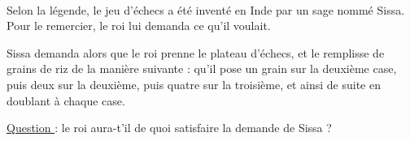 \documentclass[
	classe=$2^{de}$,
	headerTitle=Activité\space Chapitre\space 2
]{exercice}
\begin{document}
\vspace{1em}
\begin{exercice}\

	Selon la légende, le jeu d'échecs a été inventé en Inde par un sage nommé Sissa. Pour le remercier, le roi lui demanda ce qu'il voulait.

	Sissa demanda alors que le roi prenne le plateau d'échecs, et le remplisse de grains de riz de la manière suivante : qu'il pose un grain sur la deuxième case, puis deux sur la deuxième, puis quatre sur la troisième, et ainsi de suite en doublant à chaque case.

	\uline{Question } : le roi aura-t'il de quoi satisfaire la demande de Sissa ?
\end{exercice}
\end{document}
